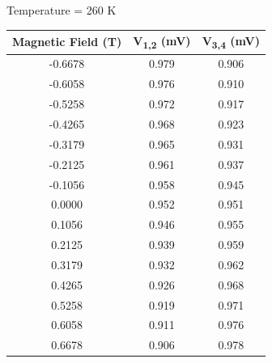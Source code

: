 \documentclass[twocolumn]{article}
\begin{document}
\begin{minipage}{\linewidth}
\Centering
Temperature = 260 K
\begin{tabular}{|c|c|c|}
\hline
Magnetic Field (T) & V\textsubscript{1,2} (mV) & V\textsubscript{3,4} (mV) \\ \hline
-0.6678 & 0.979 & 0.906 \\ \hline
-0.6058 & 0.976 & 0.910 \\ \hline
-0.5258 & 0.972 & 0.917 \\ \hline
-0.4265 & 0.968 & 0.923 \\ \hline
-0.3179 & 0.965 & 0.931 \\ \hline
-0.2125 & 0.961 & 0.937 \\ \hline
-0.1056 & 0.958 & 0.945 \\ \hline
0.0000 & 0.952 & 0.951 \\ \hline
0.1056 & 0.946 & 0.955 \\ \hline
0.2125 & 0.939 & 0.959 \\ \hline
0.3179 & 0.932 & 0.962 \\ \hline
0.4265 & 0.926 & 0.968 \\ \hline
0.5258 & 0.919 & 0.971 \\ \hline
0.6058 & 0.911 & 0.976 \\ \hline
0.6678 & 0.906 & 0.978 \\ \hline
\end{tabular}
\end{minipage}
\end{document}
